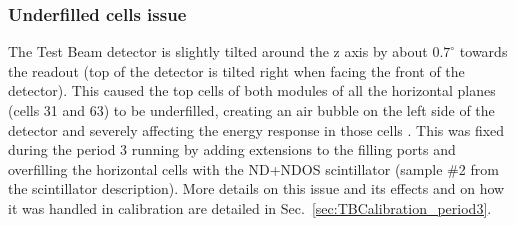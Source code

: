 



\subsubsection*{Underfilled cells issue}
The Test Beam detector is slightly tilted around the z axis by about $0.7^{\circ}$ towards the readout (top of the detector is tilted right when facing the front of the detector). This caused the top cells of both modules of all the horizontal planes (cells 31 and 63) to be underfilled, creating an air bubble on the left side of the detector and severely affecting the energy response in those cells \cite{LackeyThesisNOvATBProtons2022.pdf}. This was fixed \cite{NOvA-doc-49439} during the period 3 running by adding extensions to the filling ports and overfilling the horizontal cells with the \gls{ND}+\gls{NDOS} scintillator (sample \#2 from the scintillator description). More details on this issue and its effects and on how it was handled in calibration are detailed in Sec.~\ref{sec:TBCalibration_period3}.


